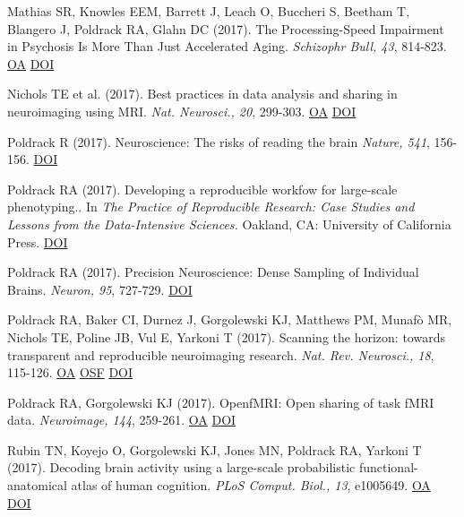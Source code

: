 Mathias SR, Knowles EEM, Barrett J, Leach O, Buccheri S, Beetham T, Blangero J, Poldrack RA, Glahn DC (2017). The Processing-Speed Impairment in Psychosis Is More Than Just Accelerated Aging. \textit{Schizophr Bull, 43}, 814-823. \href{https://www.ncbi.nlm.nih.gov/pmc/articles/PMC5472152}{OA} \href{http://dx.doi.org/10.1093/schbul/sbw168}{DOI} \vspace{2mm}

Nichols TE et al. (2017). Best practices in data analysis and sharing in neuroimaging using MRI. \textit{Nat. Neurosci., 20}, 299-303. \href{https://www.ncbi.nlm.nih.gov/pmc/articles/PMC5685169}{OA} \href{http://dx.doi.org/10.1038/nn.4500}{DOI} \vspace{2mm}

Poldrack R (2017). Neuroscience: The risks of reading the brain \textit{Nature, 541}, 156-156. \href{http://dx.doi.org/10.1038/541156a}{DOI} \vspace{2mm}

Poldrack RA (2017). Developing a reproducible workfow for large-scale phenotyping.. In \textit{The Practice of Reproducible Research: Case Studies and Lessons from the Data-Intensive Sciences.} Oakland, CA: University of California Press. \href{http://dx.doi.org/9780520294752}{DOI} \vspace{2mm}

Poldrack RA (2017). Precision Neuroscience: Dense Sampling of Individual Brains. \textit{Neuron, 95}, 727-729. \href{http://dx.doi.org/10.1016/j.neuron.2017.08.002}{DOI} \vspace{2mm}

Poldrack RA, Baker CI, Durnez J, Gorgolewski KJ, Matthews PM, Munafò MR, Nichols TE, Poline JB, Vul E, Yarkoni T (2017). Scanning the horizon: towards transparent and reproducible neuroimaging research. \textit{Nat. Rev. Neurosci., 18}, 115-126. \href{https://www.ncbi.nlm.nih.gov/pmc/articles/PMC6910649}{OA} \href{https://osf.io/spr9a/}{OSF} \href{http://dx.doi.org/10.1038/nrn.2016.167}{DOI} \vspace{2mm}

Poldrack RA, Gorgolewski KJ (2017). OpenfMRI: Open sharing of task fMRI data. \textit{Neuroimage, 144}, 259-261. \href{https://www.ncbi.nlm.nih.gov/pmc/articles/PMC4669234}{OA} \href{http://dx.doi.org/10.1016/j.neuroimage.2015.05.073}{DOI} \vspace{2mm}

Rubin TN, Koyejo O, Gorgolewski KJ, Jones MN, Poldrack RA, Yarkoni T (2017). Decoding brain activity using a large-scale probabilistic functional-anatomical atlas of human cognition. \textit{PLoS Comput. Biol., 13}, e1005649. \href{https://www.ncbi.nlm.nih.gov/pmc/articles/PMC5683652}{OA} \href{http://dx.doi.org/10.1371/journal.pcbi.1005649}{DOI} \vspace{2mm}

